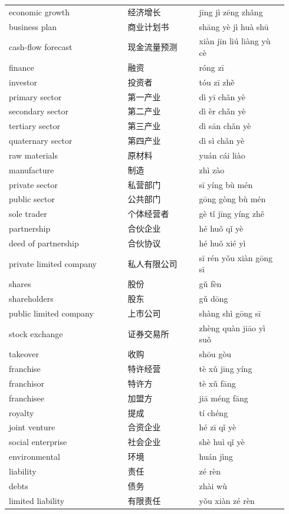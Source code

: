 \documentclass[11pt]{article}
\begin{document}
\begin{longtable}{@{}p{0.40\linewidth}p{0.24\linewidth}p{0.30\linewidth}@{}}
economic growth & 经济增长 & jīng jì zēng zhǎng \\
business plan & 商业计划书 & shāng yè jì huà shū \\
cash-flow forecast & 现金流量预测 & xiàn jīn liú liàng yù cè \\
finance & 融资 & róng zī \\
investor & 投资者 & tóu zī zhě \\
primary sector & 第一产业 & dì yī chǎn yè \\
secondary sector & 第二产业 & dì èr chǎn yè \\
tertiary sector & 第三产业 & dì sān chǎn yè \\
quaternary sector & 第四产业 & dì sì chǎn yè \\
raw materials & 原材料 & yuán cái liào \\
manufacture & 制造 & zhì zào \\
private sector & 私营部门 & sī yíng bù mén \\
public sector & 公共部门 & gōng gòng bù mén \\
sole trader & 个体经营者 & gè tǐ jīng yíng zhě \\
partnership & 合伙企业 & hé huǒ qǐ yè \\
deed of partnership & 合伙协议 & hé huǒ xié yì \\
private limited company & 私人有限公司 & sī rén yǒu xiàn gōng sī \\
shares & 股份 & gǔ fèn \\
shareholders & 股东 & gǔ dōng \\
public limited company & 上市公司 & shàng shì gōng sī \\
stock exchange & 证券交易所 & zhèng quàn jiāo yì suǒ \\
takeover & 收购 & shōu gòu \\
franchise & 特许经营 & tè xǔ jīng yíng \\
franchisor & 特许方 & tè xǔ fāng \\
franchisee & 加盟方 & jiā méng fāng \\
royalty & 提成 & tí chéng \\
joint venture & 合资企业 & hé zī qǐ yè \\
social enterprise & 社会企业 & shè huì qǐ yè \\
environmental & 环境 & huán jìng \\
liability & 责任 & zé rèn \\
debts & 债务 & zhài wù \\
limited liability & 有限责任 & yǒu xiàn zé rèn \\

\end{longtable}
\end{document}

